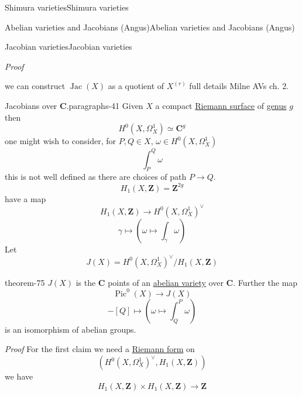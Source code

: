 \documentclass[10pt,]{book}
\makeatletter
\renewcommand*{\proofname}{Proof}
\renewenvironment{proof}[1][\proofname]{\par
  \pushQED{\qed}%
  \normalfont \topsep6\p@\@plus6\p@\relax
  \trivlist
  \item\relax
    {\itshape
    #1\@addpunct{.}}\hspace\labelsep\ignorespaces
}{%
  \popQED\endtrivlist\@endpefalse
}
\numberwithin{equation}{section}
\newcommand{\ZZ}{\mathbf{Z}}
\newcommand{\CC}{\mathbf{C}}
\DeclareMathOperator{\Pic}{Pic}
\DeclareMathOperator{\Jac}{Jac}
\makeatother
\begin{document}
\begin{chapterptx}{Shimura varieties}{}{Shimura varieties}{}{}
\begin{sectionptx}{Abelian varieties and Jacobians (Angus)}{}{Abelian varieties and Jacobians (Angus)}{}{}
\begin{subsectionptx}{Jacobian varieties}{}{Jacobian varieties}{}{}
\begin{proof}
\begin{equation*}
\end{equation*}
we can construct \(\Jac(X)\) as a quotient of \(X^{(r)}\) full details Milne AVs ch. 2.%
\end{proof}
\begin{paragraphs}{Jacobians over \(\CC\).}{paragraphs-41}%
\hypertarget{p-1106}{}%
Given \(X\) a compact \hyperref[def-top-riem-surface]{Riemann surface} of \hyperref[def-class-set]{genus} \(g\) then%
\begin{equation*}
H^0(X, \Omega_X^1) \simeq \CC^g
\end{equation*}
one might wish to consider, for \(P,Q \in X\), \(\omega\in H^0(X, \Omega_X^1)\)%
\begin{equation*}
\int_P^Q \omega
\end{equation*}
this is not well defined as there are choices of path \(P\to Q\).%
\begin{equation*}
H_1(X,\ZZ) = \ZZ^{2g}
\end{equation*}
have  a map%
\begin{equation*}
H_1(X,\ZZ) \to H^0(X, \Omega_X^1) ^\vee
\end{equation*}
%
\begin{equation*}
\gamma \mapsto (\omega \mapsto \int_\gamma \omega)
\end{equation*}
Let%
\begin{equation*}
J(X) = H^0(X, \Omega_X^1) ^\vee/H_1(X,\ZZ)
\end{equation*}
%
\begin{theorem}{}{}{theorem-75}%
\hypertarget{p-1107}{}%
\(J(X) \) is the \(\CC\) points of an \hyperref[def-buntes-abvar]{abelian variety} over \(\CC\). Further the map%
\begin{equation*}
\Pic^0(X) \to J(X)
\end{equation*}
%
\begin{equation*}
[P] - [Q] \mapsto (\omega \mapsto \int^P_Q \omega)
\end{equation*}
is an isomorphism of abelian groups.%
\end{theorem}
\begin{proof}\hypertarget{proof-114}{}
\hypertarget{p-1108}{}%
For the first claim we need a \hyperref[def-riemann-form]{Riemann form} on%
\begin{equation*}
(H^0(X, \Omega_X^1)^\vee , H_1(X,\ZZ))
\end{equation*}
we have%
\begin{equation*}
H_1(X, \ZZ) \times H_1(X, \ZZ) \to \ZZ
\end{equation*}
%
\begin{equation*}

\end{equation*}
\end{proof}
\end{paragraphs}
\end{subsectionptx}
\end{sectionptx}
\end{chapterptx}
\end{document}
